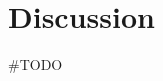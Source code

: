\documentclass[11pt,a4paper,fleqn]{article}
\begin{document}
\section{Discussion}
\#TODO





\end{document}
